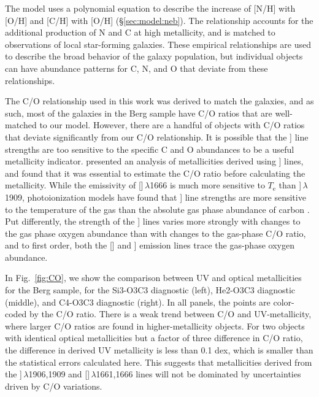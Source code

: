 \documentclass[trackchanges, preprint2]{aastex62}
\newcommand{\oiii}{[\ion{O}{3}]}
\newcommand{\ciii}{\ion{C}{3}]}
\newcommand{\Te}{\ensuremath{T_{\mathrm{e}}}\xspace}
\begin{document}
The  model uses a polynomial equation to describe the increase of [N/H] with [O/H] and [C/H] with [O/H] (\S\ref{sec:model:neb}). The relationship accounts for the additional production of N and C at high metallicity, and is matched to observations of local star-forming galaxies. These empirical relationships are used to describe the broad behavior of the galaxy population, but individual objects can have abundance patterns for C, N, and O that deviate from these relationships.

The C/O relationship used in this work was derived to match the \citet{Berg+2016} galaxies, and as such, most of the galaxies in the Berg sample have C/O ratios that are well-matched to our model. However, there are a handful of objects with C/O ratios that deviate significantly from our C/O relationship. It is possible that the \ciii{} line strengths are too sensitive to the specific C and O abundances to be a useful metallicity indicator. \citet{PerezMontero+2017} presented an analysis of metallicities derived using \ciii{} lines, and found that it was essential to estimate the C/O ratio before calculating the metallicity. While the emissivity of \oiii$\,\lambda$1666 is much more sensitive to \Te than \ciii$\,\lambda$1909, photoionization models have found that \ciii{} line strengths are more sensitive to the temperature of the gas than the absolute gas phase abundance of carbon \citep{Jaskot+2016, Byler+2018}. Put differently, the strength of the \ciii{} lines varies more strongly with changes to the gas phase oxygen abundance than with changes to the gas-phase C/O ratio, and to first order, both the \oiii{} and \ciii{} emission lines trace the gas-phase oxygen abundance.

In Fig.~\ref{fig:CO}, we show the comparison between UV and optical metallicities for the Berg sample, for the Si3-O3C3 diagnostic (left), He2-O3C3 diagnostic (middle), and C4-O3C3 diagnostic (right). In all panels, the points are color-coded by the C/O ratio. There is a weak trend between C/O and UV-metallicity, where larger C/O ratios are found in higher-metallicity objects. For two objects with identical optical metallicities but a factor of three difference in C/O ratio, the difference in derived UV metallicity is less than 0.1 dex, which is smaller than the statistical errors calculated here. This suggests that metallicities derived from the \ciii$\,\lambda$1906,1909 and \oiii$\,\lambda$1661,1666 lines will not be dominated by uncertainties driven by C/O variations.
\end{document}
